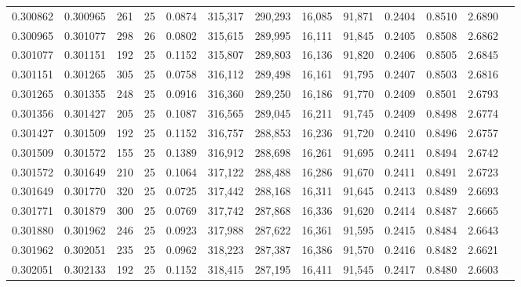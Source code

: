 \begin{tabular}{rrrrrrrrrrrrr}
0.300862 & 0.300965 &   261 &  25 &                                     0.0874 & 315,317 & 290,293 &  16,085 &  91,871 & 0.2404 & 0.8510 & 2.6890 \\
0.300965 & 0.301077 &   298 &  26 &                                     0.0802 & 315,615 & 289,995 &  16,111 &  91,845 & 0.2405 & 0.8508 & 2.6862 \\
0.301077 & 0.301151 &   192 &  25 &                                     0.1152 & 315,807 & 289,803 &  16,136 &  91,820 & 0.2406 & 0.8505 & 2.6845 \\
0.301151 & 0.301265 &   305 &  25 &                                     0.0758 & 316,112 & 289,498 &  16,161 &  91,795 & 0.2407 & 0.8503 & 2.6816 \\
0.301265 & 0.301355 &   248 &  25 &                                     0.0916 & 316,360 & 289,250 &  16,186 &  91,770 & 0.2409 & 0.8501 & 2.6793 \\
0.301356 & 0.301427 &   205 &  25 &                                     0.1087 & 316,565 & 289,045 &  16,211 &  91,745 & 0.2409 & 0.8498 & 2.6774 \\
0.301427 & 0.301509 &   192 &  25 &                                     0.1152 & 316,757 & 288,853 &  16,236 &  91,720 & 0.2410 & 0.8496 & 2.6757 \\
0.301509 & 0.301572 &   155 &  25 &                                     0.1389 & 316,912 & 288,698 &  16,261 &  91,695 & 0.2411 & 0.8494 & 2.6742 \\
0.301572 & 0.301649 &   210 &  25 &                                     0.1064 & 317,122 & 288,488 &  16,286 &  91,670 & 0.2411 & 0.8491 & 2.6723 \\
0.301649 & 0.301770 &   320 &  25 &                                     0.0725 & 317,442 & 288,168 &  16,311 &  91,645 & 0.2413 & 0.8489 & 2.6693 \\
0.301771 & 0.301879 &   300 &  25 &                                     0.0769 & 317,742 & 287,868 &  16,336 &  91,620 & 0.2414 & 0.8487 & 2.6665 \\
0.301880 & 0.301962 &   246 &  25 &                                     0.0923 & 317,988 & 287,622 &  16,361 &  91,595 & 0.2415 & 0.8484 & 2.6643 \\
0.301962 & 0.302051 &   235 &  25 &                                     0.0962 & 318,223 & 287,387 &  16,386 &  91,570 & 0.2416 & 0.8482 & 2.6621 \\
0.302051 & 0.302133 &   192 &  25 &                                     0.1152 & 318,415 & 287,195 &  16,411 &  91,545 & 0.2417 & 0.8480 & 2.6603 \\

\end{tabular}
